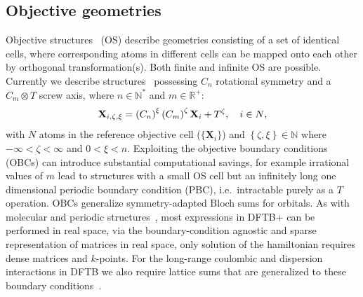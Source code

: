 \documentclass[reprint,onecolumn,superscriptaddress]{revtex4-1}
\newcommand{\dftbp}{DFTB+}
\begin{document}
\subsection{Objective geometries}

Objective structures~\cite{James2006} (OS) describe geometries consisting of a
set of identical cells, where corresponding atoms in different cells can be
mapped onto each other by orthogonal transformation(s). Both finite and infinite
OS are possible. Currently we describe
structures~\cite{James2006,Dumitrica2007,ZhangHuaDumitrica2008}
possessing $C_n$ rotational symmetry and a $C_m \otimes T$ screw axis, where $n
\in \mathbb{N}^{*}$ and $m \in \mathbb{R}^{+}$:
\begin{equation}
  \mathbf{X}_{i, \zeta, \xi} =
  \left(C_n\right)^\xi \left(C_m\right)^\zeta \mathbf{X}_{i}+ T^\zeta,\quad{i \in N},
  \label{basic_replicate_obj}
\end{equation}
with $N$ atoms in the reference objective cell ($\{\mathbf{X}_i\}$) and
$\left\{\zeta,\xi\right\} \in \mathbb{N}$ where $-\infty < \zeta < \infty$ and
$0 < \xi < n$. Exploiting the objective boundary conditions (OBCs) can introduce
substantial computational savings, for example irrational values of $m$ lead to
structures with a small OS cell but an infinitely long one dimensional periodic
boundary condition (PBC), i.e.\ intractable purely as a $T$ operation. OBCs
generalize symmetry-adapted Bloch sums for orbitals. As with molecular and
periodic structures~\cite{aradi-jpca-2007}, most expressions in \dftbp{} can be
performed in real space, via the boundary-condition agnostic and sparse
representation of matrices in real space, only solution of the hamiltonian
requires dense matrices and $k$-points. For the long-range coulombic and
dispersion interactions in DFTB we also require lattice sums that are
generalized to these boundary conditions~\cite{Nikiforov2013}.
\end{document}
